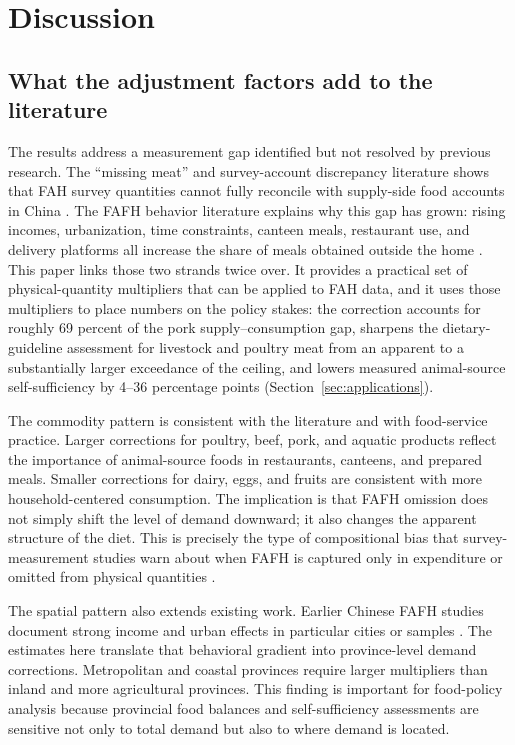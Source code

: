 \documentclass[preprint,12pt,authoryear]{elsarticle}
\begin{document}
\section{Discussion}
\label{sec:discussion}

\subsection{What the adjustment factors add to the literature}

The results address a measurement gap identified but not resolved by previous research. The ``missing meat'' and survey-account discrepancy literature shows that FAH survey quantities cannot fully reconcile with supply-side food accounts in China \citep{MaHuangRozelle2004, YuAbler2014, Xiao2015, YuAbler2016}. The FAFH behavior literature explains why this gap has grown: rising incomes, urbanization, time constraints, canteen meals, restaurant use, and delivery platforms all increase the share of meals obtained outside the home \citep{Ma2006, Bai2010, Bai2012, Liu2015, GaoZheng2020}. This paper links those two strands twice over. It provides a practical set of physical-quantity multipliers that can be applied to FAH data, and it uses those multipliers to place numbers on the policy stakes: the correction accounts for roughly 69 percent of the pork supply--consumption gap, sharpens the dietary-guideline assessment for livestock and poultry meat from an apparent to a substantially larger exceedance of the ceiling, and lowers measured animal-source self-sufficiency by 4--36 percentage points (Section~\ref{sec:applications}).

The commodity pattern is consistent with the literature and with food-service practice. Larger corrections for poultry, beef, pork, and aquatic products reflect the importance of animal-source foods in restaurants, canteens, and prepared meals. Smaller corrections for dairy, eggs, and fruits are consistent with more household-centered consumption. The implication is that FAFH omission does not simply shift the level of demand downward; it also changes the apparent structure of the diet. This is precisely the type of compositional bias that survey-measurement studies warn about when FAFH is captured only in expenditure or omitted from physical quantities \citep{Zezza2017, FiedlerYadav2017, ReitzigEtAl2023}.

The spatial pattern also extends existing work. Earlier Chinese FAFH studies document strong income and urban effects in particular cities or samples \citep{Bai2010, Liu2015}. The estimates here translate that behavioral gradient into province-level demand corrections. Metropolitan and coastal provinces require larger multipliers than inland and more agricultural provinces. This finding is important for food-policy analysis because provincial food balances and self-sufficiency assessments are sensitive not only to total demand but also to where demand is located.
\end{document}
